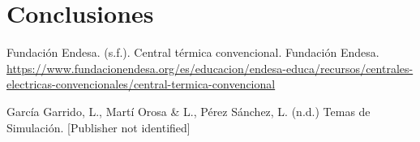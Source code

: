 \documentclass[twocolumn, fontsize=10pt]{article}
\begin{document}
\section{Conclusiones}


\renewcommand\refname{Referencias}

\begin{thebibliography}{}

  \sloppypar
   Fundación Endesa. (s.f.). Central térmica convencional. Fundación Endesa. \url{https://www.fundacionendesa.org/es/educacion/endesa-educa/recursos/centrales-electricas-convencionales/central-termica-convencional}


   García Garrido, L., Martí Orosa \& L., Pérez Sánchez, L. (n.d.) Temas de Simulación. [Publisher not identified]

\end{thebibliography}
    
    
\end{document}
